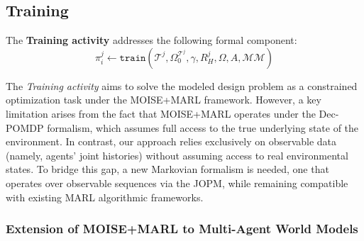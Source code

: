 \documentclass[pdflatex,sn-mathphys-num]{sn-jnl}%
\theoremstyle{thmstyleone}%
\theoremstyle{thmstyletwo}%
\theoremstyle{thmstylethree}%
\begin{document}
\subsection{Training}\label{sec:training}

The \textbf{Training activity} addresses the following formal component:
%
\begin{displaymath}
    \pi^j_i \gets \texttt{train}(\mathcal{T}^j, \Omega^{\mathcal{T}^j}_0, \gamma, R^j_H, \Omega, A, \mathcal{MM})
\end{displaymath}

The \textit{Training activity} aims to solve the modeled design problem as a constrained optimization task under the MOISE+MARL framework. However, a key limitation arises from the fact that MOISE+MARL operates under the Dec-POMDP formalism, which assumes full access to the true underlying state of the environment. In contrast, our approach relies exclusively on observable data (namely, agents' joint histories) without assuming access to real environmental states. To bridge this gap, a new Markovian formalism is needed, one that operates over observable sequences via the JOPM, while remaining compatible with existing MARL algorithmic frameworks.


\subsubsection{Extension of MOISE+MARL to Multi-Agent World Models}
\end{document}
